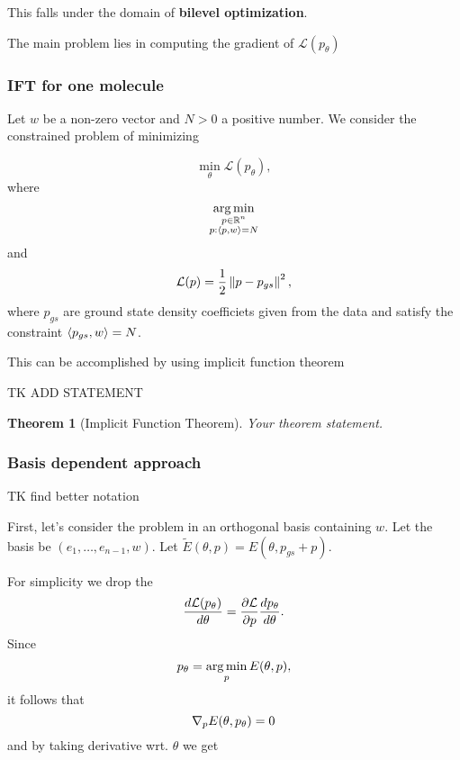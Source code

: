 \documentclass[a4paper,10pt]{report}
\newtheorem{theorem}{Theorem}
\begin{document}
This falls under the domain of \textbf{bilevel optimization}.

The main problem lies in computing the gradient of $\mathcal{L}(p_\theta)$


\subsubsection{IFT for one molecule}
Let $w$ be a non-zero vector and $N>0$ a positive number.
We consider the constrained problem of minimizing

\begin{equation}
 \min_\theta \mathcal{L}(p_\theta),
\end{equation}
where
\begin{equation}
\operatorname*{arg\,min}_{\substack{p \in \mathbb{R}^n \\ p: \langle p, w \rangle=N }}
\end{equation}
and
\begin{equation}
 \mathcal{L}(p) = \frac{1}{2} \left\|p-p_{gs}\right\|^2,
\end{equation}
where $p_{gs}$ are ground state density coefficiets given from the data and satisfy the constraint $\langle p_{gs}, w \rangle = N$.

This can be accomplished by using implicit function theorem

TK ADD STATEMENT
\begin{theorem}[Implicit Function Theorem]
Your theorem statement.
\end{theorem}

\subsubsection{Basis dependent approach}
TK find better notation

First, let's consider the problem in an orthogonal basis containing $w$.
Let the basis be $(e_1,\ldots, e_{n-1}, w)$.
Let $\widetilde{E}(\theta, p) = E(\theta, p_{gs}+ p)$.



For simplicity we drop the
\begin{equation}
 \frac{d\mathcal{L}(p_\theta)}{d \theta} = \frac{\partial \mathcal{L}}{\partial p}\frac{dp_\theta}{d \theta}.
\end{equation}
Since
\begin{equation}
 p_\theta = \operatorname*{arg\,min}_p E(\theta, p),
\end{equation}
it follows that
\begin{equation}
 \nabla_p E(\theta, p_\theta) = 0
\end{equation}
and by taking derivative wrt. $\theta$ we get
\end{document}
